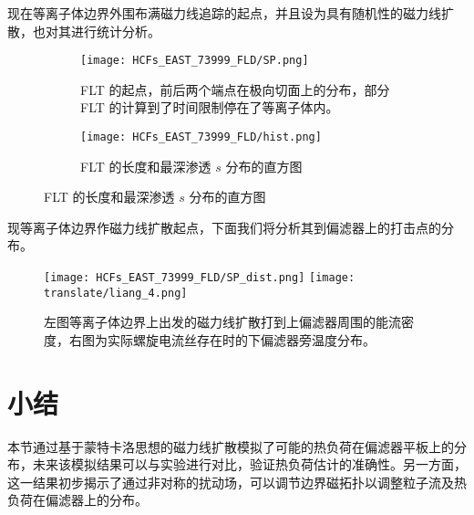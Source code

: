 现在等离子体边界外围布满磁力线追踪的起点，并且设为具有随机性的磁力线扩散，也对其进行统计分析。 

\begin{figure}[htbp]
    \centering
  \begin{subfigure}{0.4\textwidth}
    \texttt{[image: HCFs\_EAST\_73999\_FLD/SP.png]}
    \caption{FLT 的起点，前后两个端点在极向切面上的分布，部分 FLT 的计算到了时间限制停在了等离子体内。}
  \end{subfigure}%
  \begin{subfigure}{0.57\textwidth}
    \texttt{[image: HCFs\_EAST\_73999\_FLD/hist.png]}
    \caption{FLT 的长度和最深渗透 $s$ 分布的直方图}
  \end{subfigure}%
  
  \end{figure}
  

现等离子体边界作磁力线扩散起点，下面我们将分析其到偏滤器上的打击点的分布。

\begin{figure}[htbp]
    \centering%
        \texttt{[image: HCFs\_EAST\_73999\_FLD/SP\_dist.png]}
        \texttt{[image: translate/liang\_4.png]}
        \caption{左图等离子体边界上出发的磁力线扩散打到上偏滤器周围的能流密度，右图为实际螺旋电流丝存在时的下偏滤器旁温度分布。}
  \end{figure}




\section{小结}

本节通过基于蒙特卡洛思想的磁力线扩散模拟了可能的热负荷在偏滤器平板上的分布，未来该模拟结果可以与实验进行对比，验证热负荷估计的准确性。另一方面，这一结果初步揭示了通过非对称的扰动场，可以调节边界磁拓扑以调整粒子流及热负荷在偏滤器上的分布。